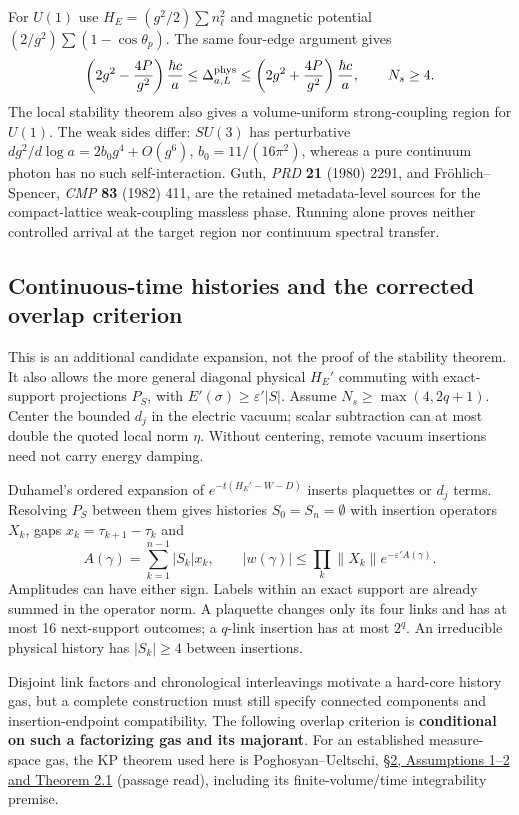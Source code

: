 \documentclass[11pt,a4paper]{article}
\begin{document}
For \(U(1)\) use \(H_E=(g^2/2)\sum n_\ell^2\) and magnetic potential
\((2/g^2)\sum(1-\cos\theta_p)\). The same four-edge argument gives
\[\left(2g^2-\frac{4P}{g^2}\right)\frac{\hbar c}{a}
 \le\Delta^{\rm phys}_{a,L}\le
 \left(2g^2+\frac{4P}{g^2}\right)\frac{\hbar c}{a},\qquad N_s\ge4.\] The
local stability theorem also gives a volume-uniform strong-coupling
region for \(U(1)\). The weak sides differ: \(SU(3)\) has perturbative
\(d g^2/d\log a=2b_0g^4+O(g^6)\), \(b_0=11/(16\pi^2)\), whereas a pure
continuum photon has no such self-interaction. Guth, \emph{PRD}
\textbf{21} (1980) 2291, and Fröhlich--Spencer, \emph{CMP} \textbf{83}
(1982) 411, are the retained metadata-level sources for the
compact-lattice weak-coupling massless phase. Running alone proves
neither controlled arrival at the target region nor continuum spectral
transfer.

\hypertarget{continuous-time-histories-and-the-corrected-overlap-criterion}{%
\subsection{Continuous-time histories and the corrected overlap
criterion}\label{continuous-time-histories-and-the-corrected-overlap-criterion}}

This is an additional candidate expansion, not the proof of the
stability theorem. It also allows the more general diagonal physical
\(H_E'\) commuting with exact-support projections \(P_S\), with
\(E'(\sigma)\ge\varepsilon'|S|\). Assume \(N_s\ge\max(4,2q+1)\). Center
the bounded \(d_j\) in the electric vacuum; scalar subtraction can at
most double the quoted local norm \(\eta\). Without centering, remote
vacuum insertions need not carry energy damping.

Duhamel's ordered expansion of \(e^{-t(H_E'-W-D)}\) inserts plaquettes
or \(d_j\) terms. Resolving \(P_S\) between them gives histories
\(S_0=S_n=\emptyset\) with insertion operators \(X_k\), gaps
\(x_k=\tau_{k+1}-\tau_k\) and
\[A(\gamma)=\sum_{k=1}^{n-1}|S_k|x_k,\qquad
 |w(\gamma)|\le\prod_k\|X_k\|e^{-\varepsilon'A(\gamma)}.\] Amplitudes
can have either sign. Labels within an exact support are already summed
in the operator norm. A plaquette changes only its four links and has at
most 16 next-support outcomes; a \(q\)-link insertion has at most
\(2^q\). An irreducible physical history has \(|S_k|\ge4\) between
insertions.

Disjoint link factors and chronological interleavings motivate a
hard-core history gas, but a complete construction must still specify
connected components and insertion-endpoint compatibility. The following
overlap criterion is \textbf{conditional on such a factorizing gas and
its majorant}. For an established measure-space gas, the KP theorem used
here is Poghosyan--Ueltschi, \href{https://arxiv.org/pdf/0811.4281}{§2,
Assumptions 1--2 and Theorem 2.1} (passage read), including its
finite-volume/time integrability premise.
\end{document}
